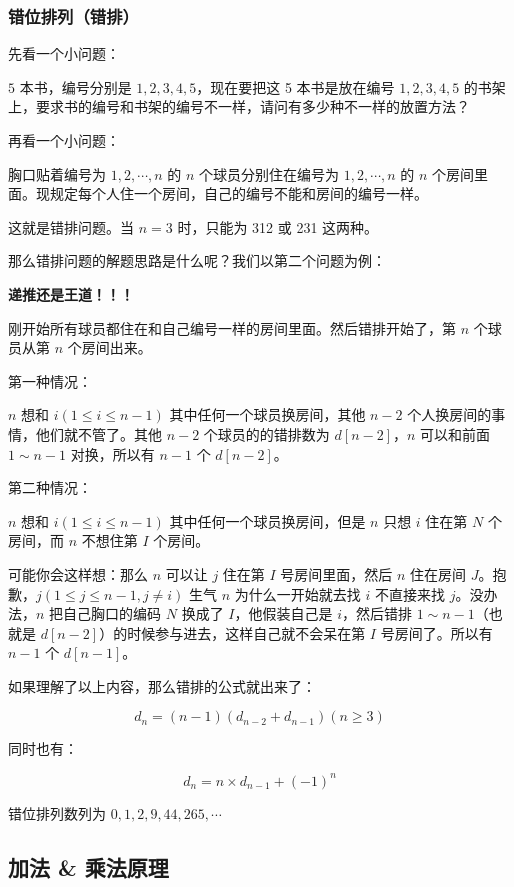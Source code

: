 \subsubsection{错位排列（错排）}

先看一个小问题：

$5$ 本书，编号分别是 $1,2,3,4,5$，现在要把这 5 本书是放在编号 $1,2,3,4,5$ 的书架上，要求书的编号和书架的编号不一样，请问有多少种不一样的放置方法？

再看一个小问题：

胸口贴着编号为 $1,2,\cdots,n$ 的 $n$ 个球员分别住在编号为 $1,2,\cdots,n$ 的 $n$ 个房间里面。现规定每个人住一个房间，自己的编号不能和房间的编号一样。

这就是错排问题。当 $n=3$ 时，只能为 312 或 231 这两种。

那么错排问题的解题思路是什么呢？我们以第二个问题为例：

\textbf{ 递推还是王道！！！}

刚开始所有球员都住在和自己编号一样的房间里面。然后错排开始了，第 $n$ 个球员从第 $n$ 个房间出来。

第一种情况：

$n$ 想和 $i(1 \le i \le n-1)$ 其中任何一个球员换房间，其他 $n-2$ 个人换房间的事情，他们就不管了。其他 $n-2$ 个球员的的错排数为 $d[n-2]$，$n$ 可以和前面 $1 \sim n-1$ 对换，所以有 $n-1$ 个 $d[n-2]$。

第二种情况：

$n$ 想和 $i(1 \le i \le n-1)$ 其中任何一个球员换房间，但是 $n$ 只想 $i$ 住在第 $N$ 个房间，而 $n$ 不想住第 $I$ 个房间。

可能你会这样想：那么 $n$ 可以让 $j$ 住在第 $I$ 号房间里面，然后 $n$ 住在房间 $J$。抱歉，$j(1 \le j \le n-1,j\neq i)$ 生气 $n$ 为什么一开始就去找 $i$ 不直接来找 $j$。没办法，$n$ 把自己胸口的编码 $N$ 换成了 $I$，他假装自己是 $i$，然后错排 $1 \sim n-1$（也就是 $d[n-2]$）的时候参与进去，这样自己就不会呆在第 $I$ 号房间了。所以有 $n-1$ 个 $d[n-1]$。

如果理解了以上内容，那么错排的公式就出来了：

$$
d_n = (n-1)(d_{n-2} + d_{n-1}) (n\geq 3)
$$

同时也有：

$$
d_n = n \times d_{n-1} + (-1)^n
$$

错位排列数列为 $0,1,2,9,44,265,\cdots$

\subsection{加法 \& 乘法原理}

